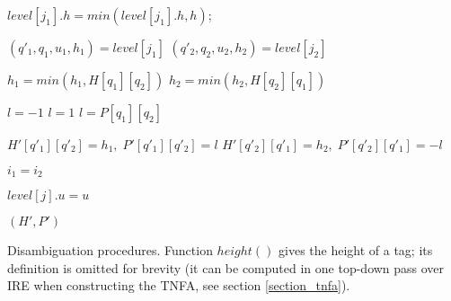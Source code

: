 \documentclass[AMA,STIX1COL]{WileyNJD-v2}
\begin{document}
\begin{algorithm}[H]
\begin{multicols}{2}
{{{                \BlankLine
                 {
                    $level[j_1].h = min(level[j_1].h, h)$; \;

                    \BlankLine
                     {
                        $(q'_1, q_1, u_1, h_1) = level[j_1]$ \;
                        $(q'_2, q_2, u_2, h_2) = level[j_2]$ \;

                        \BlankLine
                         {
                            $h_1 = min(h_1, H[q_1][q_2])$ \;
                            $h_2 = min(h_2, H[q_2][q_1])$ \;
                        }

                        \BlankLine
                            {$l = -1$}
                            {$l = 1$ }
                         {$l = P[q_1][q_2]$}
                    }

                    \BlankLine
                    $H'[q'_1][q'_2] = h_1, \; P'[q'_1][q'_2] = l$ \;
                    $H'[q'_2][q'_1] = h_2, \; P'[q'_2][q'_1] = -l$ \;
                }

                $i_1 = i_2$ \;
            }

            \BlankLine
             {
                $level[j].u = u$
            }
        }

        \BlankLine
        \Return $(H', P')$ \;
    }

\end{multicols}
\vspace{1em}
\caption{Disambiguation procedures.
Function $height()$ gives the height of a tag; its definition is omitted for brevity
(it can be computed in one top-down pass over IRE when constructing the TNFA, see section \ref{section_tnfa}).
}
\end{algorithm}
\medskip
\end{document}
